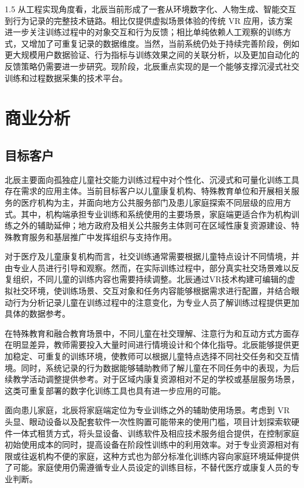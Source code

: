 \documentclass[zihao=-4]{ctexart}
\begin{document}
\begin{spacing}{1.5}
从工程实现角度看，北辰当前形成了一套从环境数字化、人物生成、智能交互到行为记录的完整技术链路。相比仅提供虚拟场景体验的传统 VR 应用，该方案进一步关注训练过程中的对象交互和行为反馈；相比单纯依赖人工观察的训练方式，又增加了可重复记录的数据维度。当然，当前系统仍处于持续完善阶段，例如更大规模用户数据验证、行为指标与训练效果之间的关联分析，以及更加自动化的反馈策略仍需要进一步研究。现阶段，北辰重点实现的是一个能够支撑沉浸式社交训练和过程数据采集的技术平台。


\section{商业分析}

\subsection{目标客户}

北辰主要面向孤独症儿童社交能力训练过程中对个性化、沉浸式和可量化训练工具存在需求的应用主体。当前目标客户以儿童康复机构、特殊教育单位和开展相关服务的医疗机构为主，并面向地方公共服务部门及患儿家庭探索不同层级的应用方式。其中，机构端承担专业训练和系统使用的主要场景，家庭端更适合作为机构训练之外的辅助延伸；地方政府及相关公共服务主体则可在区域性康复资源建设、特殊教育服务和基层推广中发挥组织与支持作用。

对于医疗及儿童康复机构而言，社交训练通常需要根据儿童特点设计不同情境，并由专业人员进行引导和观察。然而，在实际训练过程中，部分真实社交场景难以反复组织，不同儿童的训练内容也需要持续调整。北辰通过VR技术构建可编辑的虚拟社交环境，使训练场景、交互对象和任务内容能够根据需求进行配置，并结合眼动行为分析记录儿童在训练过程中的注意变化，为专业人员了解训练过程提供更加具体的数据参考。

在特殊教育和融合教育场景中，不同儿童在社交理解、注意行为和互动方式方面存在明显差异，教师需要投入大量时间进行情境设计和个体化指导。北辰能够提供更加稳定、可重复的训练环境，使教师可以根据儿童特点选择不同社交任务和交互情境。同时，系统记录的行为数据能够辅助教师了解儿童在不同任务中的表现，为后续教学活动调整提供参考。对于区域内康复资源相对不足的学校或基层服务场景，这类可重复部署的数字化训练工具也具有进一步应用的可能。

面向患儿家庭，北辰将家庭端定位为专业训练之外的辅助使用场景。考虑到 VR 头显、眼动设备以及配套软件一次性购置可能带来的使用门槛，项目计划探索软硬件一体式租赁方式，将头显设备、训练软件及相应技术服务组合提供，在控制家庭初始使用成本的同时，提高设备在阶段性训练中的利用效率。对于专业资源相对有限或往返机构不便的家庭，这种方式也为部分标准化训练内容向家庭环境延伸提供了可能。家庭使用仍需遵循专业人员设定的训练目标，不替代医疗或康复人员的专业判断。


\end{spacing}
\end{document}
